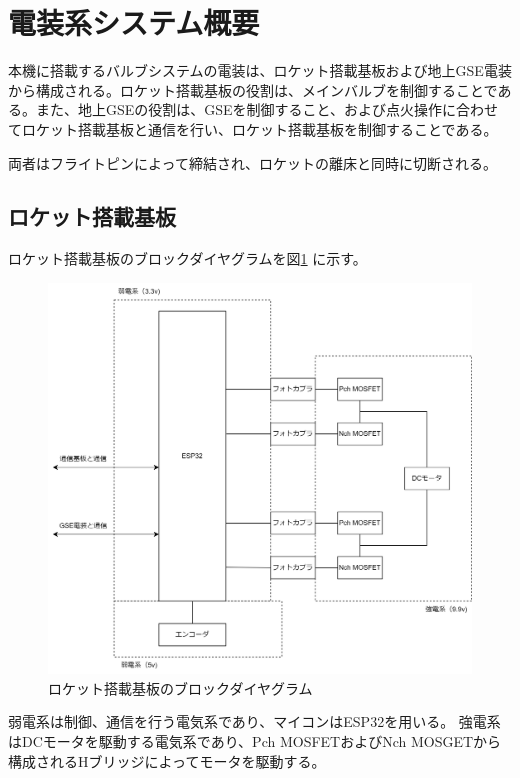 \documentclass[dvipdfmx,a4j]{jsarticle}
\begin{document}
\section{電装系システム概要}

本機に搭載するバルブシステムの電装は、ロケット搭載基板および地上GSE電装から構成される。ロケット搭載基板の役割は、メインバルブを制御することである。また、地上GSEの役割は、GSEを制御すること、および点火操作に合わせてロケット搭載基板と通信を行い、ロケット搭載基板を制御することである。

両者はフライトピンによって締結され、ロケットの離床と同時に切断される。

\subsection{ロケット搭載基板}

ロケット搭載基板のブロックダイヤグラムを図\ref{newGenPropulsionBRDChart} に示す。

\begin{figure}[htbp]
    \centering
    \includegraphics[width = 15cm]{figures/newGenPropulsionBRDChart.drawio.png}
    \caption{ロケット搭載基板のブロックダイヤグラム}
    \label{newGenPropulsionBRDChart}
\end{figure}

弱電系は制御、通信を行う電気系であり、マイコンはESP32を用いる。
強電系はDCモータを駆動する電気系であり、Pch MOSFETおよびNch MOSGETから構成されるHブリッジによってモータを駆動する。
\end{document}
